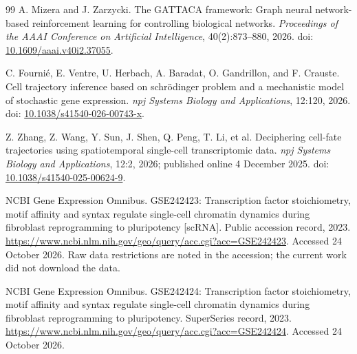 \documentclass[11pt]{article}
\newcommand{\1}{\mathbf{1}}
\begin{document}
\begin{thebibliography}{99}
A. Mizera and J. Zarzycki. The GATTACA framework: Graph neural network-based reinforcement learning for controlling biological networks. \emph{Proceedings of the AAAI Conference on Artificial Intelligence}, 40(2):873--880, 2026. doi: \href{https://doi.org/10.1609/aaai.v40i2.37055}{10.1609/aaai.v40i2.37055}.

C. Fourni{\'e}, E. Ventre, U. Herbach, A. Baradat, O. Gandrillon, and F. Crauste.
Cell trajectory inference based on schr{\"o}dinger problem and a mechanistic model of stochastic gene expression. \emph{npj Systems Biology and Applications}, 12:120, 2026. doi: \href{https://doi.org/10.1038/s41540-026-00743-x}{10.1038/s41540-026-00743-x}.

Z. Zhang, Z. Wang, Y. Sun, J. Shen, Q. Peng, T. Li, et al.
Deciphering cell-fate trajectories using spatiotemporal single-cell transcriptomic data. \emph{npj Systems Biology and Applications}, 12:2, 2026; published online 4 December 2025. doi: \href{https://doi.org/10.1038/s41540-025-00624-9}{10.1038/s41540-025-00624-9}.

NCBI Gene Expression Omnibus. GSE242423: Transcription factor stoichiometry, motif affinity and syntax regulate single-cell chromatin dynamics during fibroblast reprogramming to pluripotency [scRNA]. Public accession record, 2023. \url{https://www.ncbi.nlm.nih.gov/geo/query/acc.cgi?acc=GSE242423}. Accessed 24 October 2026. Raw data restrictions are noted in the accession; the current work did not download the data.

NCBI Gene Expression Omnibus. GSE242424: Transcription factor stoichiometry, motif affinity and syntax regulate single-cell chromatin dynamics during fibroblast reprogramming to pluripotency. SuperSeries record, 2023. \url{https://www.ncbi.nlm.nih.gov/geo/query/acc.cgi?acc=GSE242424}. Accessed 24 October 2026.

\end{thebibliography}
\end{document}
